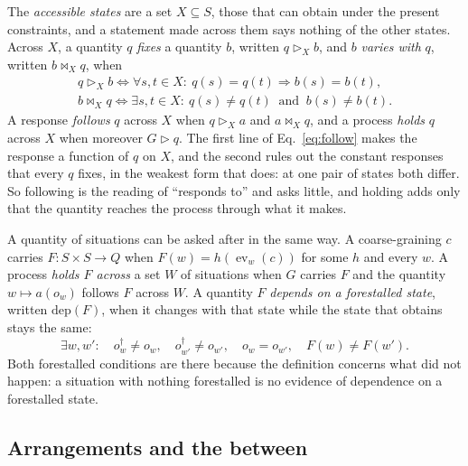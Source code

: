 \documentclass[11pt]{amsart}
\DeclareMathOperator{\ev}{ev}
\theoremstyle{plain}
\begin{document}
The \emph{accessible states} are a set $X\subseteq S$, those that can obtain under the present constraints, and a statement made across them says nothing of the other states. Across $X$, a quantity $q$ \emph{fixes} a quantity $b$, written $q\rhd_Xb$, and $b$ \emph{varies with} $q$, written $b\bowtie_Xq$, when
\begin{equation}\label{eq:follow}
  \begin{gathered}
  q\rhd_Xb\iff\forall s,t\in X:\ q(s)=q(t)\Rightarrow b(s)=b(t),\\
  b\bowtie_Xq\iff\exists s,t\in X:\ q(s)\ne q(t)\ \text{ and }\ b(s)\ne b(t).
  \end{gathered}
\end{equation}
A response \emph{follows} $q$ across $X$ when $q\rhd_Xa$ and $a\bowtie_Xq$, and a process \emph{holds} $q$ across $X$ when moreover $G\rhd q$. The first line of Eq.~\eqref{eq:follow} makes the response a function of $q$ on $X$, and the second rules out the constant responses that every $q$ fixes, in the weakest form that does: at one pair of states both differ. So following is the reading of ``responds to'' and asks little, and holding adds only that the quantity reaches the process through what it makes.

A quantity of situations can be asked after in the same way. A coarse-graining $c$ carries $F:S\times S\to Q$ when $F(w)=h(\ev_w(c))$ for some $h$ and every $w$. A process \emph{holds $F$ across} a set $W$ of situations when $G$ carries $F$ and the quantity $w\mapsto a(o_w)$ follows $F$ across $W$. A quantity $F$ \emph{depends on a forestalled state}, written $\mathrm{dep}(F)$, when it changes with that state while the state that obtains stays the same:
\begin{equation}\label{eq:dep}
  \exists w,w':\quad o_w^\dagger\ne o_w,\quad o_{w'}^\dagger\ne o_{w'},\quad o_w=o_{w'},\quad F(w)\ne F(w').
\end{equation}
Both forestalled conditions are there because the definition concerns what did not happen: a situation with nothing forestalled is no evidence of dependence on a forestalled state.

\subsection{Arrangements and the between}
\end{document}
